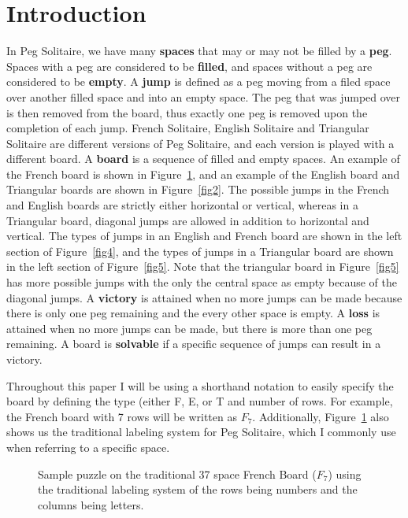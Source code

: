 \documentclass{article}
\begin{document}
\section{Introduction}
In Peg Solitaire, we have many \textbf{spaces} that may or may not be filled by a \textbf{peg}. Spaces with a peg are considered to be \textbf{filled}, and spaces without a peg are considered to be \textbf{empty}. A \textbf{jump} is defined as a peg moving from a filed space over another filled space and into an empty space. The peg that was jumped over is then removed from the board, thus exactly one peg is removed upon the completion of each jump. French Solitaire, English Solitaire and Triangular Solitaire are different versions of Peg Solitaire, and each version is played with a different board. A \textbf{board} is a sequence of filled and empty spaces. An example of the French board is shown in Figure~\ref{fig1}, and an example of the English board and Triangular boards are shown in Figure~\ref{fig2}. The possible jumps in the French and English boards are strictly either horizontal or vertical, whereas in a Triangular board, diagonal jumps are allowed in addition to horizontal and vertical. The types of jumps in an English and French board are shown in the left section of Figure~\ref{fig4}, and the types of jumps in a Triangular board are shown in the left section of Figure~\ref{fig5}. Note that the triangular board in Figure~\ref{fig5} has more possible jumps with the only the central space as empty because of the diagonal jumps. A \textbf{victory} is attained when no more jumps can be made because there is only one peg remaining and the every other space is empty. A \textbf{loss} is attained when no more jumps can be made, but there is more than one peg remaining. A board is \textbf{solvable} if a specific sequence of jumps can result in a victory.

Throughout this paper I will be using a shorthand notation to easily specify the board by defining the type (either F, E, or T and number of rows. For example, the French board with 7 rows will be written as $F_7$. Additionally, Figure~\ref{fig1} also shows us the traditional labeling system for Peg Solitaire, which I commonly use when referring to a specific space.

\begin{figure}[htb]
\centering
{}
\caption{Sample puzzle on the traditional 37 space French Board ($F_7$) using the traditional labeling system of the rows being numbers and the columns being letters.}
\label{fig1}
\end{figure}
\end{document}
